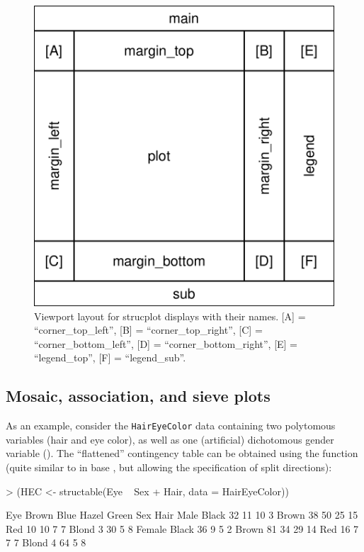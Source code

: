 \documentclass{Z}
\newcommand{\data}[1]{\texttt{#1}}
\newcommand{\codefun}[1]{\code{#1()}}
\begin{document}
\begin{figure}[h]
\begin{center}
\includegraphics{strucplot-vcdlayout}
\caption{Viewport layout for strucplot displays with their names. [A] =
  ``corner\_top\_left'', [B] = ``corner\_top\_right'', 
  [C] = ``corner\_bottom\_left'', [D] = ``corner\_bottom\_right'', [E]
  = ``legend\_top'', [F] = ``legend\_sub''.}
\label{fig:layout}
\end{center}
\end{figure}

\subsection{Mosaic, association, and sieve plots}

As an example, consider the \data{HairEyeColor} 
data containing two polytomous variables (hair and eye color), 
as well as one (artificial) dichotomous gender variable (). The
``flattened'' contingency table can be obtained using the
\codefun{structable} function (quite similar to \codefun{ftable} in
base , but allowing the specification of split directions):

\begin{Schunk}
\begin{Sinput}
> (HEC <- structable(Eye ~ Sex + Hair, data = HairEyeColor))
\end{Sinput}
\begin{Soutput}
             Eye Brown Blue Hazel Green
Sex    Hair                            
Male   Black        32   11    10     3
       Brown        38   50    25    15
       Red          10   10     7     7
       Blond         3   30     5     8
Female Black        36    9     5     2
       Brown        81   34    29    14
       Red          16    7     7     7
       Blond         4   64     5     8
\end{Soutput}
\end{Schunk}
\end{document}
